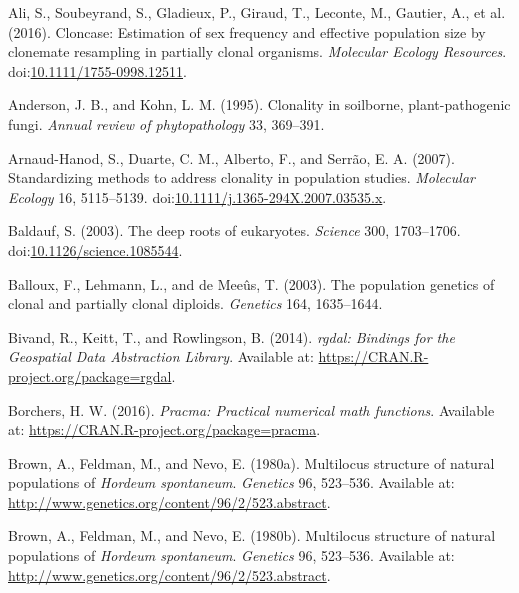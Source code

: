 \documentclass[double,12pt]{beavtex}
\begin{document}
  \hypertarget{ref-ali2016cloncase}{}
  Ali, S., Soubeyrand, S., Gladieux, P., Giraud, T., Leconte, M., Gautier,
  A., et al. (2016). Cloncase: Estimation of sex frequency and effective
  population size by clonemate resampling in partially clonal organisms.
  \emph{Molecular Ecology Resources}.
  doi:\href{https://doi.org/10.1111/1755-0998.12511}{10.1111/1755-0998.12511}.
  
  \hypertarget{ref-anderson1995clonality}{}
  Anderson, J. B., and Kohn, L. M. (1995). Clonality in soilborne,
  plant-pathogenic fungi. \emph{Annual review of phytopathology} 33,
  369--391.
  
  \hypertarget{ref-arnaud2007standardizing}{}
  Arnaud-Hanod, S., Duarte, C. M., Alberto, F., and Serrão, E. A. (2007).
  Standardizing methods to address clonality in population studies.
  \emph{Molecular Ecology} 16, 5115--5139.
  doi:\href{https://doi.org/10.1111/j.1365-294X.2007.03535.x}{10.1111/j.1365-294X.2007.03535.x}.
  
  \hypertarget{ref-baldauf2003deep}{}
  Baldauf, S. (2003). The deep roots of eukaryotes. \emph{Science} 300,
  1703--1706.
  doi:\href{https://doi.org/10.1126/science.1085544}{10.1126/science.1085544}.
  
  \hypertarget{ref-balloux2003population}{}
  Balloux, F., Lehmann, L., and de Meeûs, T. (2003). The population
  genetics of clonal and partially clonal diploids. \emph{Genetics} 164,
  1635--1644.
  
  \hypertarget{ref-bivand2014rgdal}{}
  Bivand, R., Keitt, T., and Rowlingson, B. (2014). \emph{rgdal: Bindings
  for the Geospatial Data Abstraction Library}. Available at:
  \url{https://CRAN.R-project.org/package=rgdal}.
  
  \hypertarget{ref-borchers2016pracma}{}
  Borchers, H. W. (2016). \emph{Pracma: Practical numerical math
  functions}. Available at:
  \url{https://CRAN.R-project.org/package=pracma}.
  
  \hypertarget{ref-Brown:1980}{}
  Brown, A., Feldman, M., and Nevo, E. (1980a). Multilocus structure of
  natural populations of \emph{Hordeum spontaneum}. \emph{Genetics} 96,
  523--536. Available at:
  \url{http://www.genetics.org/content/96/2/523.abstract}.
  
  \hypertarget{ref-brown1980multilocus}{}
  Brown, A., Feldman, M., and Nevo, E. (1980b). Multilocus structure of
  natural populations of \emph{Hordeum spontaneum}. \emph{Genetics} 96,
  523--536. Available at:
  \url{http://www.genetics.org/content/96/2/523.abstract}.
  
\end{document}
